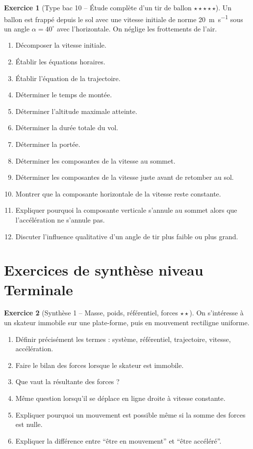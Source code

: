 \documentclass[11pt,a4paper]{article}
\theoremstyle{definition}
\newtheorem{exercice}{Exercice}[section]
\newcommand{\etoiles}[1]{\hfill{\small\textbf{#1}}}
\begin{document}
\begin{exercice}[Type bac 10 -- Étude complète d’un tir de ballon \etoiles{$\star\star\star\star\star$}]
Un ballon est frappé depuis le sol avec une vitesse initiale de norme \SI{20}{m.s^{-1}} sous un angle
$\alpha=40^\circ$ avec l’horizontale. On néglige les frottements de l’air.

\begin{enumerate}[label=\arabic*.]
    \item Décomposer la vitesse initiale.
    \item Établir les équations horaires.
    \item Établir l’équation de la trajectoire.
    \item Déterminer le temps de montée.
    \item Déterminer l’altitude maximale atteinte.
    \item Déterminer la durée totale du vol.
    \item Déterminer la portée.
    \item Déterminer les composantes de la vitesse au sommet.
    \item Déterminer les composantes de la vitesse juste avant de retomber au sol.
    \item Montrer que la composante horizontale de la vitesse reste constante.
    \item Expliquer pourquoi la composante verticale s’annule au sommet alors que l’accélération ne s’annule pas.
    \item Discuter l’influence qualitative d’un angle de tir plus faible ou plus grand.
\end{enumerate}
\end{exercice}

\section{Exercices de synthèse niveau Terminale}

\begin{exercice}[Synthèse 1 -- Masse, poids, référentiel, forces \etoiles{$\star\star$}]
On s’intéresse à un skateur immobile sur une plate-forme, puis en mouvement rectiligne uniforme.

\begin{enumerate}[label=\arabic*.]
    \item Définir précisément les termes : système, référentiel, trajectoire, vitesse, accélération.
    \item Faire le bilan des forces lorsque le skateur est immobile.
    \item Que vaut la résultante des forces ?
    \item Même question lorsqu’il se déplace en ligne droite à vitesse constante.
    \item Expliquer pourquoi un mouvement est possible même si la somme des forces est nulle.
    \item Expliquer la différence entre “être en mouvement” et “être accéléré”.
\end{enumerate}
\end{exercice}
\end{document}
